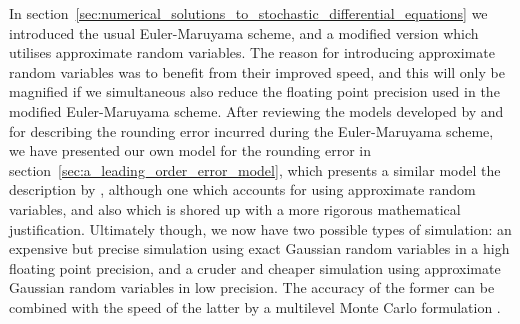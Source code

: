 \documentclass[manuscript,review]{acmart}
\begin{document}
In section~\ref{sec:numerical_solutions_to_stochastic_differential_equations} we introduced the usual Euler-Maruyama scheme, and a modified version which utilises approximate random variables. The reason for introducing approximate random variables was to benefit from their improved speed, and this will only be magnified if we simultaneous also reduce the floating point precision used in the modified Euler-Maruyama scheme. After reviewing the models developed by \citet{arciniega2003rounding} and \citet{omland2016mixed} for describing the rounding error incurred during the Euler-Maruyama scheme, we have presented our own model for the rounding error in section~\ref{sec:a_leading_order_error_model}, which presents a similar model the description by \citet{arciniega2003rounding}, although one which accounts for using approximate random variables, and also which is shored up with a more rigorous mathematical justification. Ultimately though, we now have two possible types of simulation: an expensive but precise simulation using exact Gaussian random variables in a high floating point precision, and a cruder and cheaper simulation using approximate Gaussian random variables in low precision. The accuracy of the former can be combined with the speed of the latter by a multilevel Monte Carlo formulation \citep{giles2008multilevel,giles2015multilevel_review}. 
\end{document}
